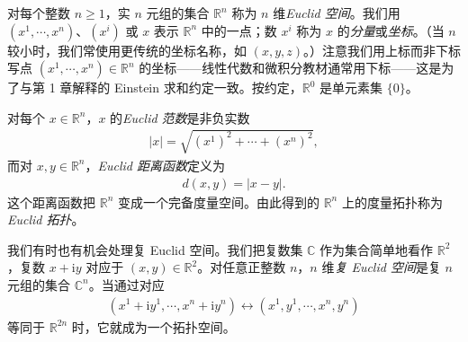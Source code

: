 \documentclass[../../main.tex]{subfiles}
\begin{document}
\begin{example}[Euclid 空间]\label{example:appA-euclidean-spaces}
对每个整数 $n\geqslant1$，实 $n$ 元组的集合 $\mathbb R^n$ 称为 $n$ 维\emph{Euclid 空间}。我们用 $(x^1,\cdots ,x^n)$、$(x^i)$ 或 $x$ 表示 $\mathbb R^n$ 中的一点；数 $x^i$ 称为 $x$ 的\emph{分量}或\emph{坐标}。（当 $n$ 较小时，我们常使用更传统的坐标名称，如 $(x,y,z)$。）注意我们用上标而非下标写点 $(x^1,\cdots ,x^n)\in\mathbb R^n$ 的坐标——线性代数和微积分教材通常用下标——这是为了与第 1 章解释的 Einstein 求和约定一致。按约定，$\mathbb R^0$ 是单元素集 $\{0\}$。

对每个 $x\in\mathbb R^n$，$x$ 的\emph{Euclid 范数}是非负实数
\begin{align*}
|x|=\sqrt{(x^1)^2+\cdots+(x^n)^2},
\end{align*}
而对 $x,y\in\mathbb R^n$，\emph{Euclid 距离函数}定义为
\begin{align*}
d(x,y)=|x-y|.
\end{align*}
这个距离函数把 $\mathbb R^n$ 变成一个完备度量空间。由此得到的 $\mathbb R^n$ 上的度量拓扑称为\emph{Euclid 拓扑}。
\end{example}

\begin{example}[复 Euclid 空间]\label{example:appA-complex-euclidean-spaces}
我们有时也有机会处理复 Euclid 空间。我们把复数集 $\mathbb C$ 作为集合简单地看作 $\mathbb R^2$，复数 $x+\mathrm{i}y$ 对应于 $(x,y)\in\mathbb R^2$。对任意正整数 $n$，$n$ 维\emph{复 Euclid 空间}是复 $n$ 元组的集合 $\mathbb C^n$。当通过对应
\begin{align*}
(x^1+\mathrm{i}y^1,\cdots ,x^n+\mathrm{i}y^n)\leftrightarrow(x^1,y^1,\cdots ,x^n,y^n)
\end{align*}
等同于 $\mathbb R^{2n}$ 时，它就成为一个拓扑空间。
\end{example}
\end{document}
